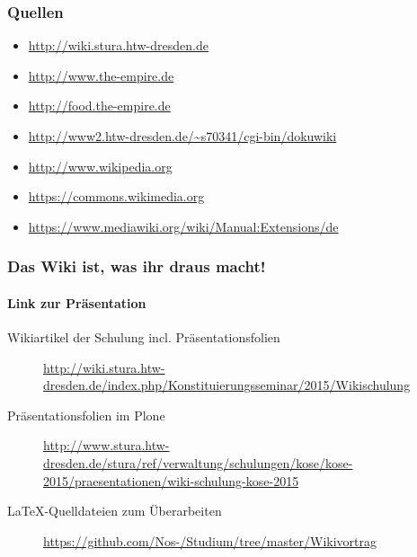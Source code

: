 \documentclass[handout]{beamer}   %
\begin{document}
\begin{frame}
  \frametitle{Quellen}
  \begin{itemize}
    \item \url{http://wiki.stura.htw-dresden.de}
    \item \url{http://www.the-empire.de}
    \item \url{http://food.the-empire.de}
    \item \url{http://www2.htw-dresden.de/~s70341/cgi-bin/dokuwiki}
    \item \url{http://www.wikipedia.org}
    \item \url{https://commons.wikimedia.org}
    \item \url{https://www.mediawiki.org/wiki/Manual:Extensions/de}
  \end{itemize}  
\end{frame}




% 
% 
%
%

\begin{frame}
  \frametitle{Das Wiki ist, was ihr draus macht!}
  \framesubtitle{Link zur Präsentation}
	\begin{description}
		\item[Wikiartikel der Schulung incl. Präsentationsfolien] \url{http://wiki.stura.htw-dresden.de/index.php/Konstituierungsseminar/2015/Wikischulung}
		\item[Präsentationsfolien im Plone] \url{http://www.stura.htw-dresden.de/stura/ref/verwaltung/schulungen/kose/kose-2015/praesentationen/wiki-schulung-kose-2015}
		\item[LaTeX-Quelldateien zum Überarbeiten] \url{https://github.com/Nos-/Studium/tree/master/Wikivortrag}
	\end{description}
\end{frame}
\end{document}
